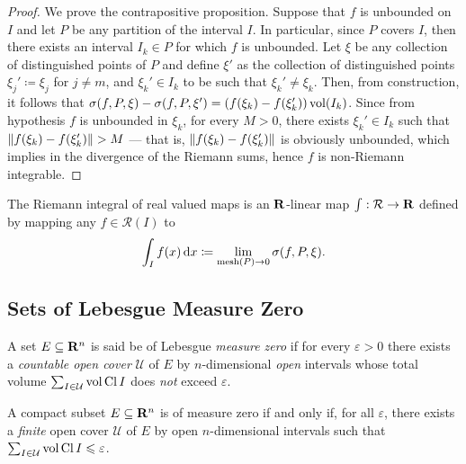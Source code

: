 \begin{proof}
    We prove the contrapositive proposition. Suppose that \(f\) is unbounded on
    \(I\) and let \(P\) be any partition of the interval \(I\). In particular, since
    \(P\) covers \(I\), then there exists an interval \(I_{k} \in P\) for which
    \(f\) is unbounded. Let \(\xi\) be any collection of distinguished points of
    \(P\) and define \(\xi'\) as the collection of distinguished points \(\xi_j'
    \coloneq \xi_j\) for \(j \neq m\), and \(\xi_k' \in I_k\) to be such that
    \(\xi_k' \neq \xi_k\). Then, from construction, it follows that \(\sigma(f, P,
    \xi) - \sigma(f, P, \xi') = (f(\xi_k) - f(\xi_k')) \operatorname{vol}(I_k)\). Since from
    hypothesis \(f\) is unbounded in \(\xi_k\), for every \(M > 0\), there exists
    \(\xi_k' \in I_k\) such that \(\lVert f(\xi_k) - f(\xi_k')\rVert > M\) --- that is,
    \(\lVert f(\xi_k) - f(\xi_k')\rVert\) is obviously unbounded, which implies in the
    divergence of the Riemann sums, hence \(f\) is non-Riemann integrable.
\end{proof}

\begin{definition}
    \label{def:riemann-integral}
    The Riemann integral of real valued maps is an \(\mathbf{R}\)-linear map \(\int:
    \mathcal R \to \mathbf{R}\) defined by mapping any \(f \in \mathcal R(I)\) to
    \[
        \int_I f(x)\, \mathrm{d} x \coloneq \lim_{\operatorname{mesh}(P) \to 0} \sigma(f, P, \xi).
    \]
\end{definition}

\subsection{Sets of Lebesgue Measure Zero}

\begin{definition}
    \label{def:measure-zero-set}
    A set \(E \subseteq \mathbf{R}^n\) is said be of Lebesgue \emph{measure zero} if for
    every \(\varepsilon > 0\) there exists a \emph{countable open cover} \(\mathcal
    U\) of \(E\) by \(n\)-dimensional \emph{open} intervals whose total volume
    \(\sum_{I \in \mathcal U} \operatorname{vol} \operatorname{Cl} I\) does \emph{not} exceed
    \(\varepsilon\).
\end{definition}

\begin{corollary}
    \label{cor:compact-finite-cover-infinitesimal-volume}
    A compact subset \(E \subseteq \mathbf{R}^n\) is of measure zero if and only if, for all
    \(\varepsilon\), there exists a \emph{finite} open cover \(\mathcal U\) of \(E\)
    by open \(n\)-dimensional intervals such that \(\sum_{I \in \mathcal U} \operatorname{vol}
    \operatorname{Cl} I \leqslant \varepsilon\).
\end{corollary}

